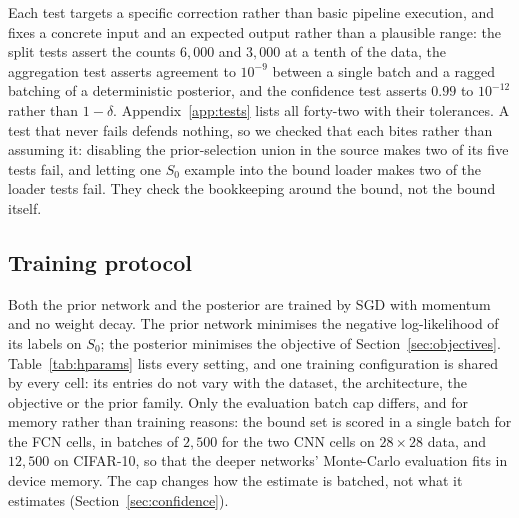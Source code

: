 Each test targets a specific correction rather than basic pipeline execution, and
fixes a concrete input and an expected output rather than a plausible range: the
split tests assert the counts $6{,}000$ and $3{,}000$ at a tenth of the data, the
aggregation test asserts agreement to $10^{-9}$ between a single batch and a
ragged batching of a deterministic posterior, and the confidence test asserts
$0.99$ to $10^{-12}$ rather than $1-\delta$. Appendix~\ref{app:tests} lists all
forty-two with their tolerances.
A test that never fails defends nothing, so we checked that each bites rather
than assuming it: disabling the prior-selection union in the source makes two of
its five tests fail, and letting one $S_0$ example into the bound loader makes
two of the loader tests fail. They check the bookkeeping around the bound, not the bound itself.

\subsection{Training protocol}\label{sec:protocol}

Both the prior network and the posterior are trained by SGD with momentum and no
weight decay. The prior network minimises the negative log-likelihood of its
labels on $S_0$; the posterior minimises the objective of
Section~\ref{sec:objectives}. Table~\ref{tab:hparams} lists every setting, and one training configuration is
shared by every cell: its entries do
not vary with the dataset, the architecture, the objective or the prior family.
Only the evaluation batch cap differs, and for memory rather than training
reasons: the bound set is scored in a single batch for the FCN cells, in batches
of $2{,}500$ for the two CNN cells on $28\times28$ data, and $12{,}500$ on
CIFAR-10, so that the deeper networks' Monte-Carlo evaluation fits in device
memory. The cap changes how the estimate is batched, not what it estimates
(Section~\ref{sec:confidence}).

